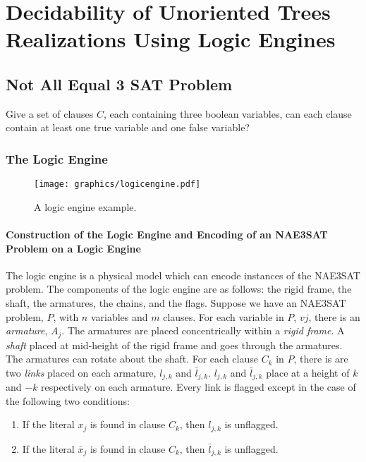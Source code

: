 \chapter{Decidability of Unoriented Trees Realizations Using Logic Engines}
\section{Not All Equal 3 SAT Problem}
\begin{prob}\label{prob:Satisfiability-2}%
Give a set of clauses $C$, each containing three boolean variables, can each clause contain at
least one true variable and one false variable?
\end{prob}
\subsection{The Logic Engine}
\begin{figure}[!htbp]
\begin{center}
\texttt{[image: graphics/logicengine.pdf]}
\caption{A logic engine example.}\label{fig:logicengine-1}
\end{center}
\end{figure}
\subsubsection{Construction of the Logic Engine and Encoding of an NAE3SAT Problem on a Logic 
Engine}
The logic engine is a physical model which can encode instances of the NAE3SAT problem.  The 
components of the logic engine are as follows: the rigid frame, the shaft, the armatures,
the chains, and the flags.  Suppose we have an NAE3SAT problem, $P$, with $n$ variables and $m$ 
clauses.  For each variable in $P$, $vj$, there is an \textit{armature}, $A_j$.  The armatures are 
placed concentrically within a \textit{rigid frame}.  A \textit{shaft} placed at mid-height of the 
rigid frame and goes through the armatures.  The armatures can rotate about the shaft.  For each 
clause $C_k$ in $P$, there is are two \textit{links} placed on each armature, $l_{j,k}$ and 
$\bar{l}_{j,k}$. $l_{j,k}$ and $\bar{l}_{j,k}$ place at a height of $k$ and $-k$ respectively on  
each armature.  Every link is flagged except in the case of the following two conditions:
\begin{enumerate}
 \item If the literal $x_j$ is found in clause $C_k$, then $l_{j,k}$ is unflagged.
 \item If the literal $\bar{x}_j$ is found in clause $C_k$, then $\bar{l}_{j,k}$ is unflagged.
\end{enumerate}

